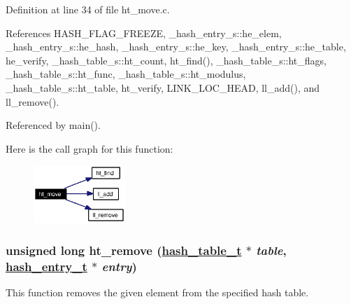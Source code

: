Definition at line 34 of file ht\_\-move.c.

References HASH\_\-FLAG\_\-FREEZE, \_\-hash\_\-entry\_\-s::he\_\-elem, \_\-hash\_\-entry\_\-s::he\_\-hash, \_\-hash\_\-entry\_\-s::he\_\-key, \_\-hash\_\-entry\_\-s::he\_\-table, he\_\-verify, \_\-hash\_\-table\_\-s::ht\_\-count, ht\_\-find(), \_\-hash\_\-table\_\-s::ht\_\-flags, \_\-hash\_\-table\_\-s::ht\_\-func, \_\-hash\_\-table\_\-s::ht\_\-modulus, \_\-hash\_\-table\_\-s::ht\_\-table, ht\_\-verify, LINK\_\-LOC\_\-HEAD, ll\_\-add(), and ll\_\-remove().

Referenced by main().

Here is the call graph for this function:\begin{figure}[H]
\begin{center}
\leavevmode
\includegraphics[width=98pt]{group__dbprim__hash_ga11_cgraph}
\end{center}
\end{figure}
\hypertarget{group__dbprim__hash_ga12}{
\subsubsection[ht\_\-remove]{\setlength{\rightskip}{0pt plus 5cm}unsigned long ht\_\-remove (\hyperlink{struct__hash__table__s}{hash\_\-table\_\-t} $\ast$ {\em table}, \hyperlink{struct__hash__entry__s}{hash\_\-entry\_\-t} $\ast$ {\em entry})}}
\label{group__dbprim__hash_ga12}


This function removes the given element from the specified hash table.

